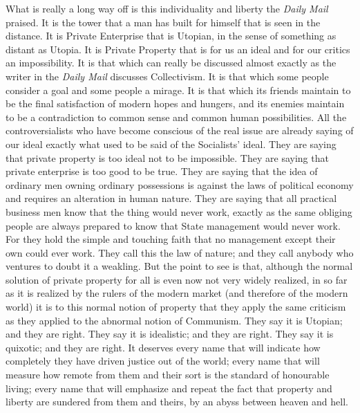 \documentclass{book}
\begin{document}
What is really a long way off is this individuality and liberty the \emph{Daily Mail} praised. It is the tower that a man has built for himself that is seen in the distance. It is Private Enterprise that is Utopian, in the sense of something as distant as Utopia. It is Private Property that is for us an ideal and for our critics an impossibility. It is that which can really be discussed almost exactly as the writer in the \emph{Daily Mail} discusses Collectivism. It is that which some people consider a goal and some people a mirage. It is that which its friends maintain to be the final satisfaction of modern hopes and hungers, and its enemies maintain to be a contradiction to common sense and common human possibilities. All the controversialists who have become conscious of the real issue are already saying of our ideal exactly what used to be said of the Socialists’ ideal. They are saying that private property is too ideal not to be impossible. They are saying that private enterprise is too good to be true. They are saying that the idea of ordinary men owning ordinary possessions is against the laws of political economy and requires an alteration in human nature. They are saying that all practical business men know that the thing would never work, exactly as the same obliging people are always prepared to know that State management would never work. For they hold the simple and touching faith that no management except their own could ever work. They call this the law of nature; and they call anybody who ventures to doubt it a weakling. But the point to see is that, although the normal solution of private property for all is even now not very widely realized, in so far as it is realized by the rulers of the modern market (and therefore of the modern world) it is to this normal notion of property that they apply the same criticism as they applied to the abnormal notion of Communism. They say it is Utopian; and they are right. They say it is idealistic; and they are right. They say it is quixotic; and they are right. It deserves every name that will indicate how completely they have driven justice out of the world; every name that will measure how remote from them and their sort is the standard of honourable living; every name that will emphasize and repeat the fact that property and liberty are sundered from them and theirs, by an abyss between heaven and hell.
\end{document}
